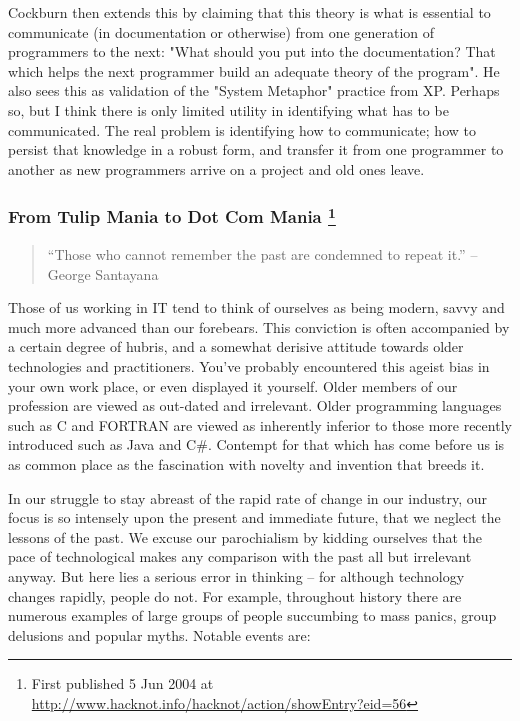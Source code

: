 \documentclass{article}
\begin{document}
\begin{enumerate}
Cockburn then extends this by claiming that this theory is what is
essential to communicate (in documentation or otherwise) from one
generation of programmers to the next: "What should you put into the
documentation? That which helps the next programmer build an adequate
theory of the program". He also sees this as validation of the "System
Metaphor" practice from XP. Perhaps so, but I think there is only
limited utility in identifying what has to be communicated. The real
problem is identifying how to communicate; how to persist that knowledge
in a robust form, and transfer it from one programmer to another as new
programmers arrive on a project and old ones leave.
\end{enumerate}

\subsubsection{From Tulip Mania to Dot Com Mania \footnote{First published 5 Jun 2004 at
\url{http://www.hacknot.info/hacknot/action/showEntry?eid=56}}}
\label{sec:orgheadline403}

\begin{quote}
“Those who cannot remember the past are condemned to repeat it.” --
George Santayana
\end{quote}

Those of us working in IT tend to think of ourselves as being modern,
savvy and much more advanced than our forebears. This conviction is
often accompanied by a certain degree of hubris, and a somewhat derisive
attitude towards older technologies and practitioners. You've probably
encountered this ageist bias in your own work place, or even displayed
it yourself. Older members of our profession are viewed as out-dated and
irrelevant. Older programming languages such as C and FORTRAN are viewed
as inherently inferior to those more recently introduced such as Java
and C\#. Contempt for that which has come before us is as common place as
the fascination with novelty and invention that breeds it.

In our struggle to stay abreast of the rapid rate of change in our
industry, our focus is so intensely upon the present and immediate
future, that we neglect the lessons of the past. We excuse our
parochialism by kidding ourselves that the pace of technological makes
any comparison with the past all but irrelevant anyway. But here lies a
serious error in thinking -- for although technology changes rapidly,
people do not. For example, throughout history there are numerous
examples of large groups of people succumbing to mass panics, group
delusions and popular myths. Notable events are:
\end{document}
